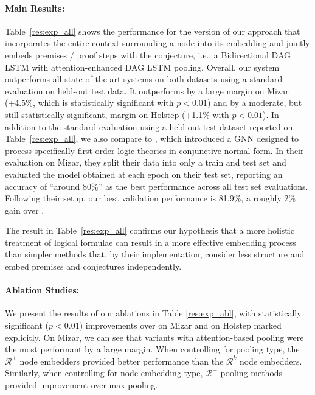 \documentclass{article}
\begin{document}
\paragraph{Main Results:} Table~\ref{res:exp_all} shows the performance for the version of our approach that incorporates the entire context surrounding a node into its embedding and jointly embeds premises / proof steps with the conjecture, i.e., a Bidirectional DAG LSTM with attention-enhanced DAG LSTM pooling.
Overall, our system outperforms all state-of-the-art systems on both datasets using a standard evaluation on held-out test data. It outperforms by a large margin on Mizar (+4.5\%, which is statistically significant with $p<0.01$) and by a moderate, but still statistically significant, margin on Holstep (+1.1\% with $p<0.01$).
In addition to the standard evaluation using a held-out test dataset reported on Table~\ref{res:exp_all}, we also compare to \cite{olvsak2019property}, which introduced a GNN designed to process specifically first-order logic theories in conjunctive normal form. In their evaluation on Mizar, they split their data into only a train and test set and evaluated the model obtained at each epoch on their test set, reporting an accuracy of ``around 80\%'' as the best performance across all test set evaluations. Following their setup, our best validation performance is 81.9\%, a roughly 2\% gain over \cite{olvsak2019property}.

The result in Table~\ref{res:exp_all} confirms our hypothesis that a more holistic treatment of logical formulae can result in a more effective embedding process than simpler methods that, by their implementation, consider less structure and embed premises and conjectures independently. 





\paragraph{Ablation Studies:} We present the results of our ablations in Table \ref{res:exp_abl}, with statistically significant ($p < 0.01$) improvements over \cite{kucik2018premise} on Mizar and \cite{wang2017premise} on Holstep marked explicitly. On Mizar, we can see that variants with attention-based pooling were the most performant by a large margin. When controlling for pooling type, the $\mathcal{R}^+$ node embedders provided better performance than the $\mathcal{R}^k$ node embedders. Similarly, when controlling for node embedding type, $\mathcal{R}^+$ pooling methods provided improvement over max pooling.
\end{document}
